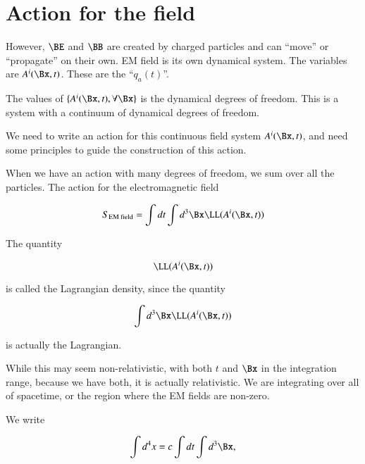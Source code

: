 %
%
\section{Action for the field}

However, \(\BE\) and \(\BB\) are created by charged particles and can ``move'' or ``propagate'' on their own.  EM field is its own dynamical system.  The variables are \(A^i(\Bx, t)\).  These are the ``\(q_a(t)\)''.

The values of \(\{A^i(\Bx, t), \forall \Bx\}\) is the dynamical degrees of freedom.  This is a system with a continuum of dynamical degrees of freedom.

We need to write an action for this continuous field system \(A^i(\Bx,t)\), and need some principles to guide the construction of this action.

When we have an action with many degrees of freedom, we sum over all the particles.  The action for the electromagnetic field

\begin{equation}\label{eqn:relativisticElectrodynamicsL12b:90}
S_{\text{EM field}} = \int dt \int d^3\Bx \LL(A^i(\Bx, t))
\end{equation}

The quantity

\begin{equation}\label{eqn:relativisticElectrodynamicsL12b:110}
\LL(A^i(\Bx, t))
\end{equation}

is called the Lagrangian density, since the quantity

\begin{equation}\label{eqn:relativisticElectrodynamicsL12b:130}
\int d^3\Bx \LL(A^i(\Bx, t))
\end{equation}

is actually the Lagrangian.

While this may seem non-relativistic, with both \(t\) and \(\Bx\) in the integration range, because we have both, it is actually relativistic.  We are integrating over all of spacetime, or the region where the EM fields are non-zero.

We write

\begin{equation}\label{eqn:relativisticElectrodynamicsL12b:150}
\int d^4 x  = c \int dt \int d^3 \Bx,
\end{equation}


